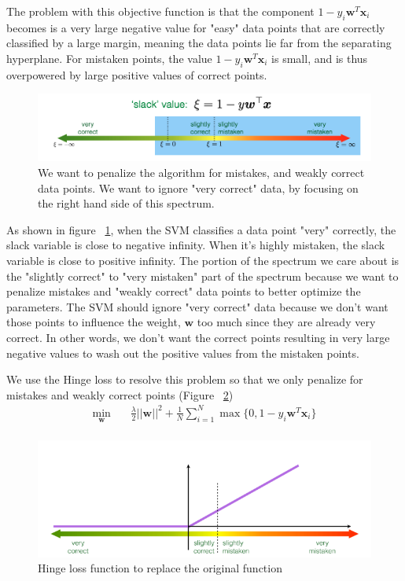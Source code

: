 \documentclass[11pt]{article}
\begin{document}
The problem with this objective function is that the component $1 - y_i \mathbf{w}^T \mathbf{x}_i$ becomes is a very large negative value for "easy" data points that are correctly classified by a large margin, meaning the data points lie far from the separating hyperplane. For mistaken points, the value $1 - y_i \mathbf{w}^T \mathbf{x}_i$ is small, and is thus overpowered by large positive values of correct points.

\begin{figure}[H]
  \centering
  \includegraphics[width=.6\linewidth]{images/spectrum_highlight.png}
  \caption{We want to penalize the algorithm for mistakes, and weakly correct data points. We want to ignore "very correct" data, by focusing on the right hand side of this spectrum.}
  \label{fig:spectrum}
\end{figure}


As shown in figure ~\ref{fig:spectrum}, when the SVM classifies a data point "very" correctly, the slack variable is close to negative infinity. When it's highly mistaken, the slack variable is close to positive infinity. 
The portion of the spectrum we care about is the "slightly correct" to "very mistaken" part of the spectrum because we want to penalize mistakes and "weakly correct" data points to better optimize the parameters. The SVM should ignore "very correct" data because we don't want those points to influence the weight, $\mathbf{w}$ too much since they are already very correct. In other words, we don't want the correct points resulting in very large negative values to wash out the positive values from the mistaken points.

We use the Hinge loss to resolve this problem so that we only penalize for mistakes and weakly correct points (Figure ~\ref{fig:hinge})
\begin{equation}
\begin{aligned}
\min_{\mathbf{w}} \quad & \frac{\lambda}{2}||\mathbf{w}||^2 + \frac{1}{N}\sum_{i=1}^N \max\{0, 1 - y_i \mathbf{w}^T \mathbf{x}_i\} \\
\end{aligned}
\end{equation}

\begin{figure}[H]
  \centering
  \includegraphics[width=.6\linewidth]{hinge.png}
  \caption{Hinge loss function to replace the original function}
  \label{fig:hinge}
\end{figure}
\end{document}
